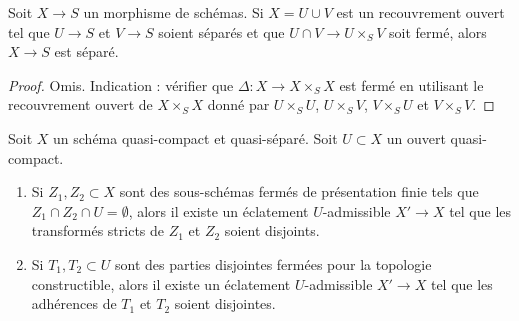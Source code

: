 \begin{lemma}
\label{lemma-check-separated}
Soit $X \to S$ un morphisme de schémas. Si $X = U \cup V$
est un recouvrement ouvert tel que $U \to S$ et $V \to S$ soient séparés
et que $U \cap V \to U \times_S V$ soit fermé, alors
$X \to S$ est séparé.
\end{lemma}

\begin{proof}
Omis. Indication : vérifier que $\Delta : X \to X \times_S X$ est
fermé en utilisant le recouvrement ouvert de $X \times_S X$ donné par
$U \times_S U$, $U \times_S V$, $V \times_S U$ et $V \times_S V$.
\end{proof}

\begin{lemma}
\label{lemma-separate-disjoint-locally-closed-by-blowing-up}
Soit $X$ un schéma quasi-compact et quasi-séparé.
Soit $U \subset X$ un ouvert quasi-compact.
\begin{enumerate}
\item Si $Z_1, Z_2 \subset X$ sont des sous-schémas fermés de
présentation finie tels que $Z_1 \cap Z_2 \cap U = \emptyset$, alors
il existe un éclatement $U$-admissible $X' \to X$
tel que les transformés stricts de $Z_1$ et $Z_2$ soient disjoints.
\item Si $T_1, T_2 \subset U$ sont des parties disjointes fermées pour la topologie constructible, alors
il existe un éclatement $U$-admissible $X' \to X$ tel que les adhérences de
$T_1$ et $T_2$ soient disjointes.
\end{enumerate}
\end{lemma}


